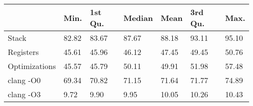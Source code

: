 \begin{table}[ht]
\centering
\begin{tabular}{p{}p{}p{}p{}p{}p{}p{}}
  \hline
 & Min. & 1st Qu. & Median & Mean & 3rd Qu. & Max. \\ 
  \hline
Stack & 82.82 & 83.67 & 87.67 & 88.18 & 93.11 & 95.10 \\ 
  Registers & 45.61 & 45.96 & 46.12 & 47.45 & 49.45 & 50.76 \\ 
  Optimizations & 45.57 & 45.79 & 50.11 & 49.91 & 51.98 & 57.48 \\ 
  clang -O0 & 69.34 & 70.82 & 71.15 & 71.64 & 71.77 & 74.89 \\ 
  clang -O3 & 9.72 & 9.90 & 9.95 & 10.05 & 10.26 & 10.43 \\ 
   \hline
\end{tabular}
\end{table}
